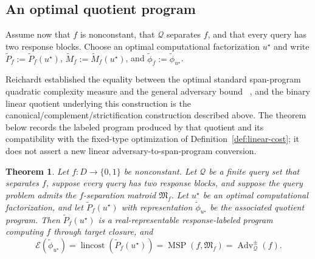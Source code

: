 \documentclass[11pt]{article}
\numberwithin{equation}{section}
\newtheorem{theorem}[definition]{Theorem}
\theoremstyle{remark}
\begin{document}
\subsection{An optimal quotient program}
\label{subsec:optimal-matroid-normal-form}

Assume now that $f$ is nonconstant, that $\mathcal Q$ separates $f$, and
that every query has two response blocks. Choose an optimal computational
factorization $u^\star$ and write
$\widetilde P_f:=\widetilde P_f(u^\star)$,
$\widetilde M_f:=\widetilde M_f(u^\star)$, and
$\widetilde\phi_f:=\widetilde\phi_{u^\star}$.

Reichardt established the equality between the optimal standard span-program
quadratic complexity measure and the general adversary bound
~\cite{Reichardt2009,Reichardt2014Equivalent},
and the binary linear quotient underlying this construction is the
canonical/complement/strictification construction described above. The theorem
below records the labeled program produced by that quotient and its
compatibility with the fixed-type optimization of Definition~\ref{def:linear-cost};
it does not assert a new linear adversary-to-span-program conversion.

\begin{theorem}
\label{thm:optimal-matroid-normal-form}
\label{thm:binary-msp-adversary-equality}
Let $f:D\to\{0,1\}$ be nonconstant. Let $\mathcal Q$ be a finite query set
that separates $f$, suppose every query has two response blocks, and suppose
the query problem admits the $f$-separation matroid $\mathfrak M_f$. Let
$u^\star$ be an optimal computational factorization, and let
$\widetilde P_f(u^\star)$ with representation
$\widetilde\phi_{u^\star}$ be the associated quotient program. Then
$\widetilde P_f(u^\star)$ is a real-representable response-labeled program
computing $f$ through target closure, and
\begin{equation}
    \mathcal E(\widetilde\phi_{u^\star})
    =
    \operatorname{lincost}(\widetilde P_f(u^\star))
    =
    \operatorname{MSP}(f,\mathfrak M_f)
    =
    \operatorname{Adv}^{\pm}_{\mathcal Q}(f).
\end{equation}
\end{theorem}
\end{document}
